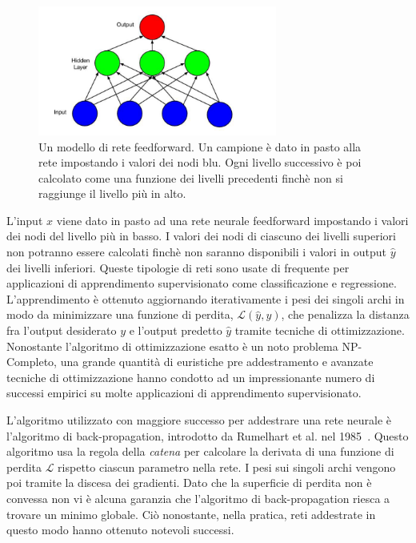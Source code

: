 \begin{figure}[tp]
  \centering
  \begin{center}
    \includegraphics[width=0.7\textwidth]{./images/feedForwardNeuralNetwork.png}
  \end{center}
  \caption{Un modello di rete feedforward.
  Un campione \`e dato in pasto alla rete impostando i valori dei nodi blu.
  Ogni livello successivo \`e poi calcolato come una funzione dei livelli precedenti finch\`e non si raggiunge il livello pi\`u in alto.}
  \label{fig:feedforwardNeuralNetwork}
\end{figure}

L'input $x$ viene dato in pasto ad una rete neurale feedforward impostando i
valori dei nodi del livello pi\`u in basso. I valori dei nodi di ciascuno dei
livelli superiori non potranno essere calcolati finch\`e non saranno disponibili i valori in output $\hat{y}$ dei livelli inferiori.
Queste tipologie di reti sono usate di frequente per applicazioni di apprendimento supervisionato come classificazione e regressione.
L'apprendimento \`e ottenuto aggiornando iterativamente i pesi dei singoli archi in modo da minimizzare una funzione di perdita, $\mathcal{L}(\hat{y},y)$, che penalizza la distanza fra l'output desiderato $y$ e l'output predetto $\hat{y}$ tramite tecniche di ottimizzazione.
Nonostante l'algoritmo di ottimizzazione esatto \`e un noto problema NP-Completo, una grande quantit\`a di euristiche pre addestramento e avanzate tecniche di ottimizzazione hanno condotto ad un impressionante numero di successi empirici su molte applicazioni di apprendimento supervisionato.

L'algoritmo utilizzato con maggiore successo per addestrare una rete neurale \`e l'algoritmo di back-propagation, introdotto da Rumelhart et al. nel 1985~\cite{Rumelhart:1985}.
Questo algoritmo usa la regola della \emph{catena} per calcolare la derivata di una funzione di perdita $\mathcal{L}$ rispetto ciascun parametro nella rete.
I pesi sui singoli archi vengono poi tramite la discesa dei gradienti.
Dato che la superficie di perdita non \`e convessa non vi \`e alcuna garanzia che l'algoritmo di back-propagation riesca a trovare un minimo globale.
Ci\`o nonostante, nella pratica, reti addestrate in questo modo hanno ottenuto notevoli successi.


